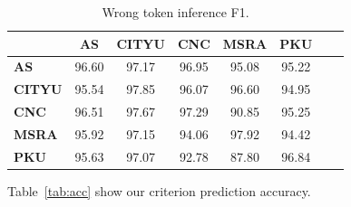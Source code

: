 \documentclass[11pt]{article}
\begin{document}
\begin{table}[t]
  \caption{Wrong token inference F1.}
  \label{tab:tkinf}
  \centering
  \begin{tabular}{lccccccc}
    \hline
                   & \textbf{AS} & \textbf{CITYU} & \textbf{CNC} & \textbf{MSRA} & \textbf{PKU} \\
    \hline
    \textbf{AS}    & 96.60       & 97.17          & 96.95        & 95.08         & 95.22        \\
    \textbf{CITYU} & 95.54       & 97.85          & 96.07        & 96.60         & 94.95        \\
    \textbf{CNC}   & 96.51       & 97.67          & 97.29        & 90.85         & 95.25        \\
    \textbf{MSRA}  & 95.92       & 97.15          & 94.06        & 97.92         & 94.42        \\
    \textbf{PKU}   & 95.63       & 97.07          & 92.78        & 87.80         & 96.84        \\
    \hline
  \end{tabular}
\end{table}

Table~\ref{tab:acc} show our criterion prediction accuracy.



\end{document}
